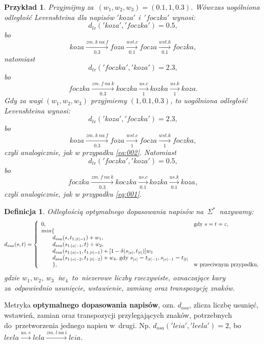 \documentclass[12pt, twoside, openany]{report}
\theoremstyle{plain}
\newtheorem{defi}{Definicja}[section]
\newtheorem{prz}{Przykład}[section]
\begin{document}
\begin{prz}
Przyjmijmy za~$(w_1, w_2, w_3) = (0.1, 1, 0.3)$. Wówczas uogólniona odległość Levenshteina dla napisów $'koza'$ i~$'foczka'$ wynosi:
\begin{equation}
\label{eq:001}
d_{lv}('koza', 'foczka') = 0.5,
\end{equation}
bo
$$
koza  \xrightarrow[0.3]{zm.\ k\ na\ f} foza  \xrightarrow[0.1]{wst. c} focza \xrightarrow[0.1]{wst. k} foczka,
$$
natomiast
\begin{equation}\label{eq:002}
d_{lv}('foczka', 'koza') = 2.3,
\end{equation}
bo
$$
foczka  \xrightarrow[0.3]{zm.\ f\ na\ k} koczka  \xrightarrow[1]{us. c} kozka \xrightarrow[1]{us. k} koza.
$$
Gdy za wagi $(w_1, w_2, w_3)$ przyjmiemy $(1, 0.1, 0.3)$, to uogólniona odległość Levenshteina wynosi:
$$
d_{lv}('koza', 'foczka') = 2.3,
$$
bo
$$
koza  \xrightarrow[0.3]{zm.\ k\ na\ f} foza  \xrightarrow[1]{wst. c} focza \xrightarrow[1]{wst. k} foczka,
$$
czyli analogicznie, jak w przypadku \ref{eq:002}. Natomiast
$$
d_{lv}('foczka', 'koza') = 0.5,
$$
bo
$$
foczka  \xrightarrow[0.3]{zm.\ f\ na\ k} koczka  \xrightarrow[0.1]{us. c} kozka \xrightarrow[0.1]{us. k} koza,
$$
czyli analogicznie, jak w przypadku \ref{eq:001}.
\end{prz}


\begin{defi}
Odległością optymalnego dopasowania napisów na~$\Sigma^*$~nazywamy:
$$
d_{osa}(s, t) = \left\{
\begin{array}{l l}     
    0, & \text{gdy } s = t = \varepsilon,\\
    min\{ & \\
\qquad    d_{osa}(s, t_{1:|t|-1}) + w_1, & \\
\qquad    d_{osa}(s_{1:|s|-1}, t) + w_2, & \\
\qquad    d_{osa}(s_{1:|s|-1}, t_{1:|t|-1}) + [1-\delta(s_{|s|}, t_{|t|})]w_3 & \\
\qquad    d_{osa}(s_{1:|s|-2}, t_{1:|t|-2}) + w_4\text{, gdy } s_{|s|} = t_{|t|-1}, s_{|s|-1} = t_{|t|} & \\
\qquad    \}, & \text{w przeciwnym przypadku},
\end{array}\right.
$$
gdzie $w_1, w_2$, $w_3$~i$w_4$~to~niezerowe liczby rzeczywiste, oznaczające kary za~odpowiednio usunięcie, wstawienie, zamianę oraz transpozycję znaków.
\end{defi}

Metryka \textbf{optymalnego dopasowania napisów}, ozn. $d_{osa}$, zlicza liczbę usunięć, wstawień, zamian oraz transpozycji przylegających znaków, potrzebnych do~przetworzenia jednego napisu w~drugi. Np. $d_{osa}('leia', 'leela') = 2$, bo $leela  \xrightarrow{us.\ e} lela  \xrightarrow{zm.\ l\ na\ i} leia$. \\
\end{document}
